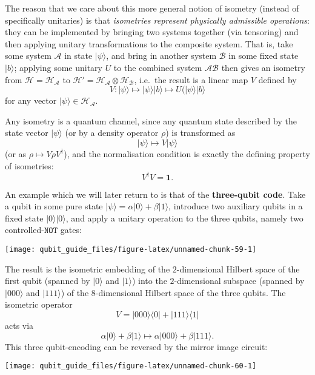 \documentclass[fleqn]{article}
\begin{document}
The reason that we care about this more general notion of isometry (instead of specifically unitaries) is that \emph{isometries represent physically admissible operations}: they can be implemented by bringing two systems together (via tensoring) and then applying unitary transformations to the composite system.
That is, take some system \(\mathcal{A}\) in state \(|\psi\rangle\), and bring in another system \(\mathcal{B}\) in some fixed state \(|b\rangle\);
applying some unitary \(U\) to the combined system \(\mathcal{A}\mathcal{B}\) then gives an isometry from \(\mathcal{H}=\mathcal{H}_\mathcal{A}\) to \(\mathcal{H}'=\mathcal{H}_\mathcal{A}\otimes\mathcal{H}_\mathcal{B}\), i.e.~the result is a linear map \(V\) defined by
\[
  V\colon
  |\psi\rangle
  \longmapsto
  |\psi\rangle|b\rangle
  \longmapsto
  U(|\psi\rangle|b\rangle
\]
for any vector \(|\psi\rangle\in\mathcal{H}_\mathcal{A}\).

Any isometry is a quantum channel, since any quantum state described by the state vector \(|\psi\rangle\) (or by a density operator \(\rho\)) is transformed as
\[
  |\psi\rangle\longmapsto V|\psi\rangle
\]
(or as \(\rho\mapsto V\rho V^\dagger\)), and the normalisation condition is exactly the defining property of isometries:
\[
  V^\dagger V =\mathbf{1}.
\]

An example which we will later return to is that of the \textbf{three-qubit code}.
Take a qubit in some pure state \(|\psi\rangle=\alpha|0\rangle+\beta|1\rangle\), introduce two auxiliary qubits in a fixed state \(|0\rangle|0\rangle\), and apply a unitary operation to the three qubits, namely two controlled-\(\texttt{NOT}\) gates:

\begin{center}\texttt{[image: qubit\_guide\_files/figure-latex/unnamed-chunk-59-1]} \end{center}

The result is the isometric embedding of the \(2\)-dimensional Hilbert space of the first qubit (spanned by \(|0\rangle\) and \(|1\rangle\)) into the \(2\)-dimensional subspace (spanned by \(|000\rangle\) and \(|111\rangle\)) of the \(8\)-dimensional Hilbert space of the three qubits.
The isometric operator
\[
  V = |000\rangle\langle 0| + |111\rangle\langle 1|
\]
acts via
\[
  \alpha|0\rangle+\beta|1\rangle
  \longmapsto \alpha|000\rangle+\beta|111\rangle.
\]
This three qubit-encoding can be reversed by the mirror image circuit:

\begin{center}\texttt{[image: qubit\_guide\_files/figure-latex/unnamed-chunk-60-1]} \end{center}
\end{document}
